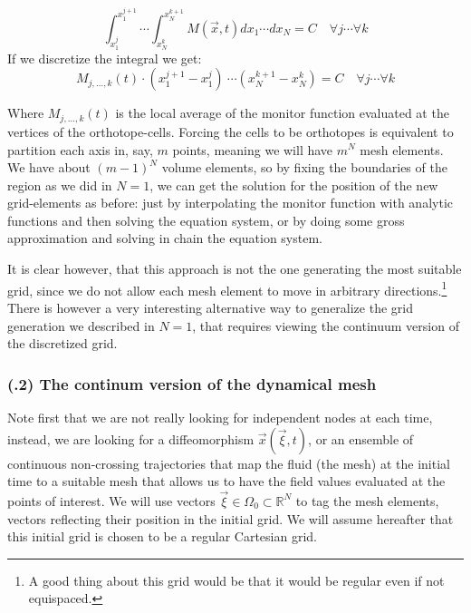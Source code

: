\documentclass[11pt, a4paper]{article} %
\newcommand{\R}{\mathbb{R}} %
\begin{document}
\begin{equation}
\int_{x_1^j}^{x_1^{j+1}}\cdots \int_{x_N^k}^{x_N^{k+1}} M(\vec{x},t) dx_1 \cdots dx_N=C \quad \forall j\cdots \forall k
\end{equation}
If we discretize the integral we get:
\begin{equation}\label{monitor}
 M_{j,...,k}(t)\cdot (x_1^{j+1}-x_1^j)\ \cdots (x_N^{k+1}-x_N^k) =C \quad \forall j\cdots \forall k
\end{equation}

Where $M_{j,...,k}(t)$ is the local average of the monitor function evaluated at the vertices of the orthotope-cells. Forcing the cells to be orthotopes is equivalent to partition each axis in, say, $m$ points, meaning we will have $m^N$ mesh elements. We have about $(m-1)^N$ volume elements, so by fixing the boundaries of the region as we did in $N=1$, we can get the solution for the position of the new grid-elements as before: just by interpolating the monitor function with analytic functions and then solving the equation system, or by doing some gross approximation and solving in chain the equation system.

It is clear however, that this approach is not the one generating the most suitable grid, since we do not allow each mesh element to move in arbitrary directions.\footnote{ A good thing about this grid would be that it would be regular even if not equispaced.} There is however a very interesting alternative way to generalize the grid generation we described in $N=1$, that requires viewing the continuum version of the discretized grid.


\subsubsection*{(\textgamma.2) The continum version of the dynamical mesh}
Note first that we are not really looking for independent nodes at each time, instead, we are looking for a diffeomorphism $\vec{x}(\vec{\xi},t)$, or an ensemble of continuous non-crossing trajectories that map the fluid (the mesh) at the initial time to a suitable mesh that allows us to have the field values evaluated at the points of interest. We will use vectors $\vec{\xi}\in\Omega_0\subset\R^N$ to tag the mesh elements, vectors reflecting their position in the initial grid. We will assume hereafter that this initial grid is chosen to be a regular Cartesian grid.
\end{document}
